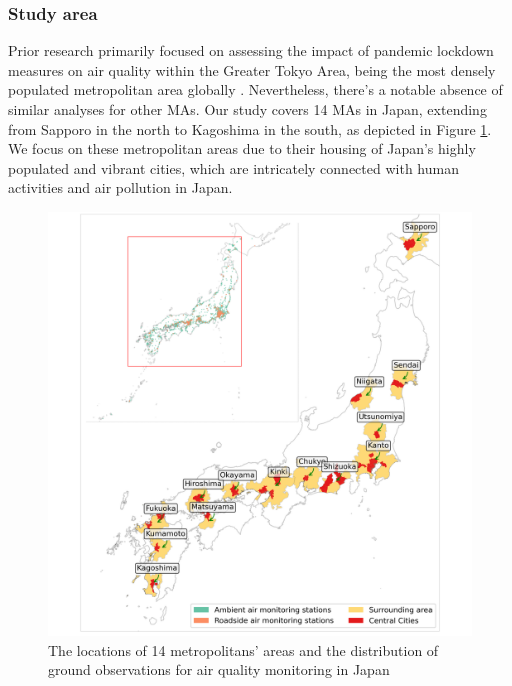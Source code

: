 \subsubsection{Study area}
Prior research primarily focused on assessing the impact of pandemic lockdown measures on air quality within the Greater Tokyo Area, being the most densely populated metropolitan area globally \citep{damiani2022peculiar,zoran2023peculiar}. Nevertheless, there's a notable absence of similar analyses for other MAs. Our study covers 14 MAs in Japan, extending from Sapporo in the north to Kagoshima in the south, as depicted in Figure \ref{fig:chap4_fig2}. We focus on these metropolitan areas due to their housing of Japan's highly populated and vibrant cities, which are intricately connected with human activities and air pollution in Japan.\par
\begin{figure}[p]
    \centering
    \includegraphics[width=\textwidth]{figs/chap4/fig2.png}
    \caption[Study area]{The locations of 14 metropolitans’ areas and the distribution of ground observations for air quality monitoring in Japan}
    \label{fig:chap4_fig2}
\end{figure}
